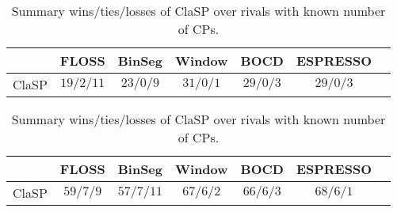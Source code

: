 \documentclass[pdflatex,sn-basic]{sn-jnl}
\begin{document}
\begin{table}[t]
	\caption{Summary wins/ties/losses of ClaSP over rivals with known number of CPs.\label{tab:semi-supervised_wtl}}	
	\begin{minipage}{12cm}
	\begin{centering}
		\begin{tabular}{c|cccccc}
			\toprule 			
			& FLOSS & BinSeg & Window & BOCD & ESPRESSO \tabularnewline
			\hline 
			ClaSP & $19/2/11$ & $23/0/9$ & $31/0/1$ & $29/0/3$ & $29/0/3$ \tabularnewline
			\bottomrule 			
		\end{tabular}
	\par\end{centering}
	\end{minipage}
	\begin{minipage}{12cm}
	\begin{centering}
		\begin{tabular}{c|cccccc}
			\toprule 			
			& FLOSS & BinSeg & Window & BOCD & ESPRESSO \tabularnewline
			\hline 
			ClaSP & $59/7/9$ & $57/7/11$ & $67/6/2$ & $66/6/3$ & $68/6/1$ \tabularnewline
			\bottomrule 			
		\end{tabular}
	\par\end{centering}
	\end{minipage}
\end{table}
\end{document}
